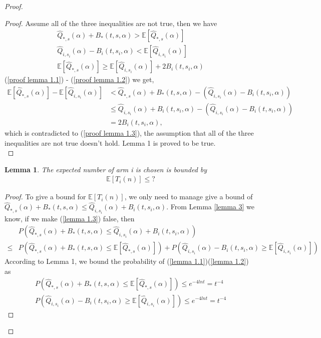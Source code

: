 \documentclass{article}
\theoremstyle{plain}
\newtheorem{lemma}{Lemma}
\begin{document}
\begin{proof}
\begin{proof}
Assume all of the three inequalities are not true, then we have
    \begin{align}
        \label{proof lemma 1.1}
         \hat{Q}_{*, s}(\alpha) + B_*(t, s, \alpha) >  \mathbb{E}[\hat{Q}_{*, s}(\alpha)]\\
        \label{proof lemma 1.2}
        \hat{Q}_{i, s_i}(\alpha) - B_i(t, s_i, \alpha) < \mathbb{E}[\hat{Q}_{i, s_i}(\alpha)]\\
        \label{proof lemma 1.3}
        \mathbb{E}[\hat{Q}_{*, s}(\alpha)] \geq \mathbb{E}[\hat{Q}_{i, s_i}(\alpha)] + 2 B_i(t, s_i, \alpha)
    \end{align}
    (\ref{proof lemma 1.1}) - (\ref{proof lemma 1.2}) we get, 
    \begin{align}
         \mathbb{E}[\hat{Q}_{*, s}(\alpha)] - \mathbb{E}[\hat{Q}_{i, s_i}(\alpha)] &< 
         \hat{Q}_{*, s}(\alpha) + B_*(t, s, \alpha) - (\hat{Q}_{i, s_i}(\alpha) - B_i(t, s_i, \alpha)) \\
        & \leq \hat{Q}_{i, s_i}(\alpha) + B_i(t, s_i, \alpha) - (\hat{Q}_{i, s_i}(\alpha) - B_i(t, s_i, \alpha)) \\
        &= 2 B_i(t, s_i, \alpha),
    \end{align}
    which is contradicted to (\ref{proof lemma 1.3}), the assumption that all of the three inequalities are not true doesn't hold. Lemma 1 is proved to be true.\\
\end{proof}

\begin{lemma}
    The expected number of arm i is chosen is bounded by 
    \begin{align}
        \mathbb{E}[T_i(n)] \leq ?
    \end{align}
\end{lemma}

\begin{proof}
To give a bound for $\mathbb{E}[T_i(n)]$, we only need to manage give a bound of $\hat{Q}_{*, s}(\alpha) + B_*(t, s, \alpha)  \leq \hat{Q}_{i, s_i}(\alpha) + B_i(t, s_i, \alpha)$. From Lemma \ref{lemma 3} we know, if we make (\ref{lemma 1.3}) false, then 
\begin{align}
    & P(\hat{Q}_{*, s}(\alpha) + B_*(t, s, \alpha)  \leq \hat{Q}_{i, s_i}(\alpha) + B_i(t, s_i, \alpha)) \\
    \leq &  P(\hat{Q}_{*, s}(\alpha) + B_*(t, s, \alpha) \leq  \mathbb{E}[\hat{Q}_{*, s}(\alpha)]) + P(\hat{Q}_{i, s_i}(\alpha) - B_i(t, s_i, \alpha) \geq \mathbb{E}[\hat{Q}_{i, s_i}(\alpha)])
\end{align}
According to Lemma 1, we bound the probability of (\ref{lemma 1.1})(\ref{lemma 1.2}) as
    \begin{align}
        P(\hat{Q}_{*, s}(\alpha) + B_*(t, s, \alpha) \leq  \mathbb{E}[\hat{Q}_{*, s}(\alpha)]) \leq  e^{-4lnt} = t^{-4}\\
        P(\hat{Q}_{i, s_i}(\alpha) - B_i(t, s_i, \alpha) \geq \mathbb{E}[\hat{Q}_{i, s_i}(\alpha)])  \leq  e^{-4lnt} = t^{-4}
    \end{align}
    

\end{proof}
\end{proof}
\end{document}
